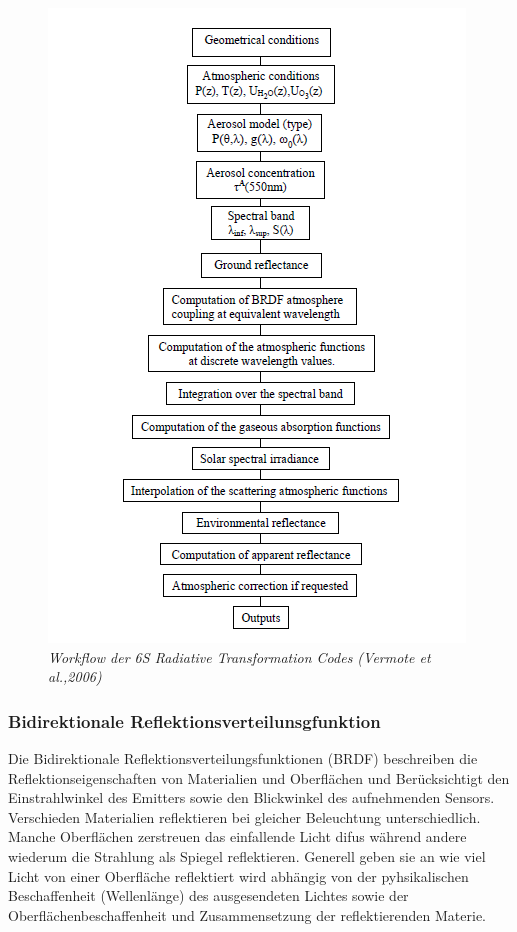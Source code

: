\documentclass[11pt]{report}
\begin{document}
\begin{figure}[H]
\centering
\includegraphics[scale=0.6]{./Grafiken/Abscal/Workflow_6S.PNG}
\caption{\textit{Workflow der 6S Radiative Transformation Codes  (Vermote et al.,2006)}}
\end{figure}

\subsubsection{Bidirektionale Reflektionsverteilunsgfunktion}

Die Bidirektionale Reflektionsverteilungsfunktionen (BRDF) beschreiben die Reflektionseigenschaften von Materialien und Oberflächen und Berücksichtigt den Einstrahlwinkel des Emitters sowie den Blickwinkel des aufnehmenden Sensors. Verschieden Materialien reflektieren bei gleicher Beleuchtung unterschiedlich. Manche Oberflächen zerstreuen das einfallende Licht difus während andere wiederum die Strahlung als Spiegel reflektieren. Generell geben sie an wie viel Licht von einer Oberfläche reflektiert wird abhängig von der pyhsikalischen Beschaffenheit (Wellenlänge) des ausgesendeten Lichtes sowie der Oberflächenbeschaffenheit und Zusammensetzung der reflektierenden Materie.\newline
\end{document}
